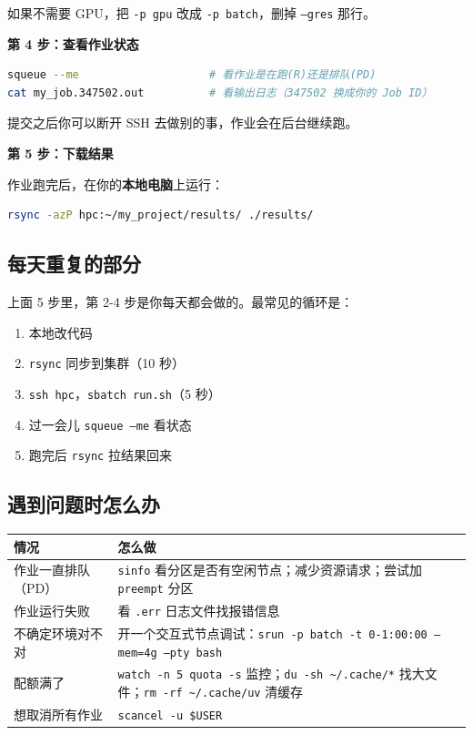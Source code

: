 如果不需要 GPU，把 \texttt{-p gpu} 改成 \texttt{-p batch}，删掉 \texttt{--gres} 那行。

\textbf{第 4 步：查看作业状态}

\begin{lstlisting}[language=bash]
squeue --me                    # 看作业是在跑(R)还是排队(PD)
cat my_job.347502.out          # 看输出日志（347502 换成你的 Job ID）
\end{lstlisting}

提交之后你可以断开 SSH 去做别的事，作业会在后台继续跑。

\textbf{第 5 步：下载结果}

作业跑完后，在你的\textbf{本地电脑}上运行：

\begin{lstlisting}[language=bash]
rsync -azP hpc:~/my_project/results/ ./results/
\end{lstlisting}

\subsection{每天重复的部分}

上面 5 步里，第 2-4 步是你每天都会做的。最常见的循环是：

\begin{enumerate}[nosep]
  \item 本地改代码
  \item \texttt{rsync} 同步到集群（10 秒）
  \item \texttt{ssh hpc}，\texttt{sbatch run.sh}（5 秒）
  \item 过一会儿 \texttt{squeue --me} 看状态
  \item 跑完后 \texttt{rsync} 拉结果回来
\end{enumerate}

\subsection{遇到问题时怎么办}

\begin{table}[h]
\centering
\small
\begin{tabular}{lp{8cm}}
\toprule
情况 & 怎么做 \\
\midrule
作业一直排队（PD） & \texttt{sinfo} 看分区是否有空闲节点；减少资源请求；尝试加 \texttt{preempt} 分区 \\
作业运行失败 & 看 \texttt{.err} 日志文件找报错信息 \\
不确定环境对不对 & 开一个交互式节点调试：\texttt{srun -p batch -t 0-1:00:00 --mem=4g --pty bash} \\
配额满了 & \texttt{watch -n 5 quota -s} 监控；\texttt{du -sh \textasciitilde/.cache/*} 找大文件；\texttt{rm -rf \textasciitilde/.cache/uv} 清缓存 \\
想取消所有作业 & \texttt{scancel -u \$USER} \\
\bottomrule
\end{tabular}
\end{table}
